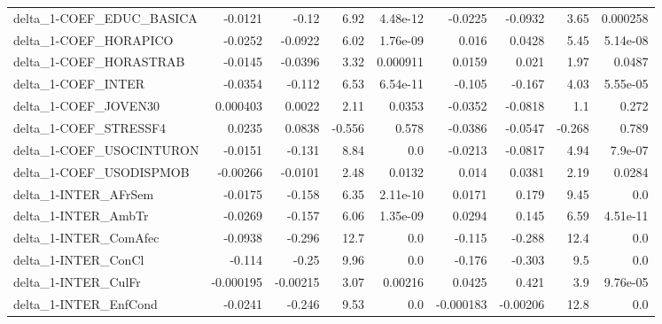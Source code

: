 \begin{tabular}{lrrrrrrrr}
delta\_1-COEF\_EDUC\_BASICA              &     -0.0121 &        -0.12 &     6.92 & 4.48e-12 &    -0.0225 &     -0.0932 &         3.65 &      0.000258 \\
delta\_1-COEF\_HORAPICO                 &     -0.0252 &      -0.0922 &     6.02 & 1.76e-09 &      0.016 &      0.0428 &         5.45 &      5.14e-08 \\
delta\_1-COEF\_HORASTRAB                &     -0.0145 &      -0.0396 &     3.32 & 0.000911 &     0.0159 &       0.021 &         1.97 &        0.0487 \\
delta\_1-COEF\_INTER                    &     -0.0354 &       -0.112 &     6.53 & 6.54e-11 &     -0.105 &      -0.167 &         4.03 &      5.55e-05 \\
delta\_1-COEF\_JOVEN30                  &    0.000403 &       0.0022 &     2.11 &   0.0353 &    -0.0352 &     -0.0818 &          1.1 &         0.272 \\
delta\_1-COEF\_STRESSF4                 &      0.0235 &       0.0838 &   -0.556 &    0.578 &    -0.0386 &     -0.0547 &       -0.268 &         0.789 \\
delta\_1-COEF\_USOCINTURON              &     -0.0151 &       -0.131 &     8.84 &      0.0 &    -0.0213 &     -0.0817 &         4.94 &       7.9e-07 \\
delta\_1-COEF\_USODISPMOB               &    -0.00266 &      -0.0101 &     2.48 &   0.0132 &      0.014 &      0.0381 &         2.19 &        0.0284 \\
delta\_1-INTER\_AFrSem                  &     -0.0175 &       -0.158 &     6.35 & 2.11e-10 &     0.0171 &       0.179 &         9.45 &           0.0 \\
delta\_1-INTER\_AmbTr                   &     -0.0269 &       -0.157 &     6.06 & 1.35e-09 &     0.0294 &       0.145 &         6.59 &      4.51e-11 \\
delta\_1-INTER\_ComAfec                 &     -0.0938 &       -0.296 &     12.7 &      0.0 &     -0.115 &      -0.288 &         12.4 &           0.0 \\
delta\_1-INTER\_ConCl                   &      -0.114 &        -0.25 &     9.96 &      0.0 &     -0.176 &      -0.303 &          9.5 &           0.0 \\
delta\_1-INTER\_CulFr                   &   -0.000195 &     -0.00215 &     3.07 &  0.00216 &     0.0425 &       0.421 &          3.9 &      9.76e-05 \\
delta\_1-INTER\_EnfCond                 &     -0.0241 &       -0.246 &     9.53 &      0.0 &  -0.000183 &    -0.00206 &         12.8 &           0.0 \\

\end{tabular}

